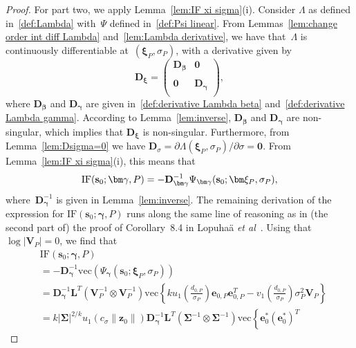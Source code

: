 \documentclass{article}
\numberwithin{equation}{section}
\theoremstyle{plain}
\newcommand{\vc}{\mathrm{vec}}
\newcommand{\bbeta}{\bm\beta}
\newcommand{\bxi}{\bm\xi}
\newcommand{\bgamma}{\bm\gamma}
\newcommand{\bSigma}{\mathbf{\Sigma}}
\newcommand{\by}{\mathbf{y}}
\newcommand{\bs}{\mathbf{s}}
\newcommand{\bz}{\mathbf{z}}
\newcommand{\be}{\mathbf{e}}
\newcommand{\bX}{\mathbf{X}}
\newcommand{\bV}{\mathbf{V}}
\newcommand{\bD}{\mathbf{D}}
\newcommand{\bL}{\mathbf{L}}
\begin{document}
\begin{proof}
For part two, we apply Lemma~\ref{lem:IF xi sigma}(i).
Consider $\Lambda$ as defined in~\eqref{def:Lambda} with~$\Psi$ defined in~\eqref{def:Psi linear}.
From Lemmas~\ref{lem:change order int diff Lambda} and~\ref{lem:Lambda derivative}, 
we have that~$\Lambda$ is continuously differentiable at~$(\bxi_P,\sigma_P)$, 
with a derivative given by
\[
\bD_{\bxi}
=
\left(
  \begin{array}{cc}
\bD_{\bbeta} & \mathbf{0}\\
    \\
\mathbf{0} & \bD_{\bgamma} \\
  \end{array}
\right),
\]
where $\bD_{\bbeta}$ and $\bD_{\bgamma}$ are given in~\eqref{def:derivative Lambda beta} and~\eqref{def:derivative Lambda gamma}.
According to Lemma~\ref{lem:inverse},
$\bD_{\bbeta}$ and $\bD_{\bgamma}$ are non-singular, which implies that $\bD_{\bxi}$ is non-singular.
Furthermore, from Lemma~\ref{lem:Dsigma=0} we have 
$\bD_\sigma=\partial\Lambda(\bxi_P,\sigma_P)/\partial\sigma=\mathbf{0}$.
From Lemma~\ref{lem:IF xi sigma}(i),
this means that
\[
\text{\rm IF}(\bs_0;\bgamma,P)
=
-\bD_{\bgamma}^{-1}
\Psi_{\bgamma}(\bs_0;\bxi_P,\sigma_P),
\]
where~$\bD_{\bgamma}^{-1}$ is given in Lemma~\ref{lem:inverse}.
The remaining derivation of the expression for $\text{IF}(\bs_0;\bgamma,P)$ runs along the same line of reasoning as in
(the second part of) the proof of Corollary~8.4 in Lopuha\"a \textit{et al}~\cite{lopuhaa-gares-ruizgazen2023}.
Using that $\log|\bV_P|=0$,
we find that 
\begin{equation}
\label{eq:decompose IF gamma}
\begin{split}
&
\text{IF}(\bs_0;\bgamma,P)\\
&=
-
\bD_{\bgamma}^{-1}
\vc\left(
\Psi_{\bgamma}(\bs_0;\bxi_P,\sigma_P)
\right)\\
&=
\bD_{\bgamma}^{-1}
\bL^T
(\bV_P^{-1}\otimes\bV_P^{-1})
\vc\left\{
ku_1\left(\frac{d_{0,P}}{\sigma_P}\right)
\be_{0,P}\be_{0,P}^T
-
v_1\left(\frac{d_{0,P}}{\sigma_P}\right)\sigma_P^2\bV_P
\right\}\\
&=
k|\bSigma|^{2/k}
u_1\left(c_\sigma\|\bz_0\|\right)
\bD_{\bgamma}^{-1}
\bL^T
\left(\bSigma^{-1}\otimes\bSigma^{-1}\right)
\vc\left\{
\be_0^*(\be_0^*)^T

\end{split}
\end{equation}
\end{proof}
\end{document}
